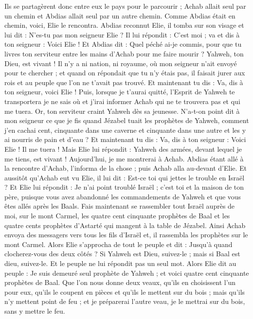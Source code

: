 \begin{multicols}{2}
Ils se partagèrent donc entre eux le pays pour le parcourir ; Achab allait seul par un chemin et Abdias allait seul par un autre chemin.
Comme Abdias était en chemin, voici, Elie le rencontra. Abdias reconnut Elie, il tomba sur son visage et lui dit : N'es-tu pas mon seigneur Elie ?
Il lui répondit : C'est moi ; va et dis à ton seigneur : Voici Elie !
Et Abdias dit : Quel péché ai-je commis, pour que tu livres ton serviteur entre les mains d'Achab pour me faire mourir ?
Yahweh, ton Dieu, est vivant ! Il n'y a ni nation, ni royaume, où mon seigneur n'ait envoyé pour te chercher ; et quand on répondait que tu n'y étais pas, il faisait jurer aux rois et au peuple que l'on ne t’avait pas trouvé.
Et maintenant tu dis : Va, dis à ton seigneur, voici Elie !
Puis, lorsque je t’aurai quitté, l'Esprit de Yahweh te transportera je ne sais où et j’irai informer Achab qui ne te trouvera pas et qui me tuera. Or, ton serviteur craint Yahweh dès sa jeunesse.
N'a-t-on point dit à mon seigneur ce que je fis quand Jézabel tuait les prophètes de Yahweh, comment j'en cachai cent, cinquante dans une caverne et cinquante dans une autre et les y ai nourris de pain et d'eau ?
Et maintenant tu dis : Va, dis à ton seigneur : Voici Elie ! Il me tuera !
Mais Elie lui répondit : Yahweh des armées, devant lequel je me tiens, est vivant ! Aujourd'hui, je me montrerai à Achab.
Abdias étant allé à la rencontre d'Achab, l’informa de la chose ; puis Achab alla au-devant d'Elie.
Et aussitôt qu'Achab eut vu Elie, il lui dit : Est-ce toi qui jettes le trouble en Israël ?
Et Elie lui répondit : Je n'ai point troublé Israël ; c'est toi et la maison de ton père, puisque vous avez abandonné les commandements de Yahweh et que vous êtes allés après les Baals.
Fais maintenant se rassembler tout Israël auprès de moi, sur le mont Carmel, les quatre cent cinquante prophètes de Baal et les quatre cents prophètes d’Astarté qui mangent à la table de Jézabel.
Ainsi Achab envoya des messagers vers tous les fils d'Israël et, il rassembla les prophètes sur le mont Carmel.
Alors Elie s'approcha de tout le peuple et dit : Jusqu'à quand clocherez-vous des deux côtés ? Si Yahweh est Dieu, suivez-le ; mais si Baal est dieu, suivez-le. Et le peuple ne lui répondit pas un seul mot.
Alors Elie dit au peuple : Je suis demeuré seul prophète de Yahweh ; et voici quatre cent cinquante prophètes de Baal.
Que l’on nous donne deux veaux, qu'ils en choisissent l'un pour eux, qu'ils le coupent en pièces et qu'ils le mettent sur du bois ; mais qu'ils n'y mettent point de feu ; et je préparerai l'autre veau, je le mettrai sur du bois, sans y mettre le feu.

\end{multicols}
